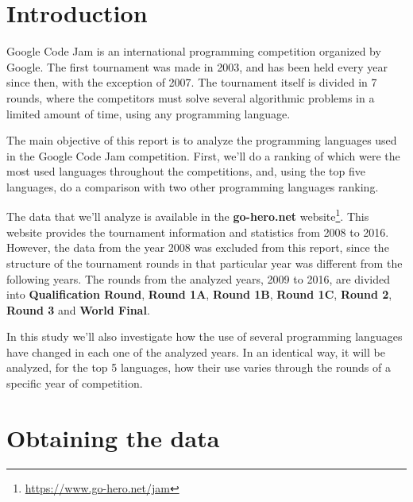 \documentclass{article}
\begin{document}
\begin{multicols*}{2}


\section{Introduction}
Google Code Jam is an international programming competition\cite{gcj} organized by Google. The first tournament was made in 2003, and has been held every year since then, with the exception of 2007. The tournament itself is divided in 7 rounds, where the competitors must solve several algorithmic problems in a limited amount of time, using any programming language.

The main objective of this report is to analyze the programming languages used in the Google Code Jam competition. First, we'll do a ranking of which were the most used languages throughout the competitions, and, using the top five languages, do a comparison with two other programming languages ranking.

The data that we'll analyze is available in the \textbf{go-hero.net} website\footnote{\url{https://www.go-hero.net/jam}}. This website provides the tournament information\cite{go-hero} and statistics from 2008 to 2016. However, the data from the year 2008 was excluded from this report, since the structure of the tournament rounds in that particular year was different from the following years. The rounds from the analyzed years, 2009 to 2016, are divided into \textbf{Qualification Round}, \textbf{Round 1A}, \textbf{Round 1B}, \textbf{Round 1C}, \textbf{Round 2}, \textbf{Round 3} and \textbf{World Final}.

In this study we'll also investigate how the use of several programming languages have changed in each one of the analyzed years. In an identical way, it will be analyzed, for the top 5 languages, how their use varies through the rounds of a specific year of competition.



\section{Obtaining the data}


\end{multicols*}
\end{document}
